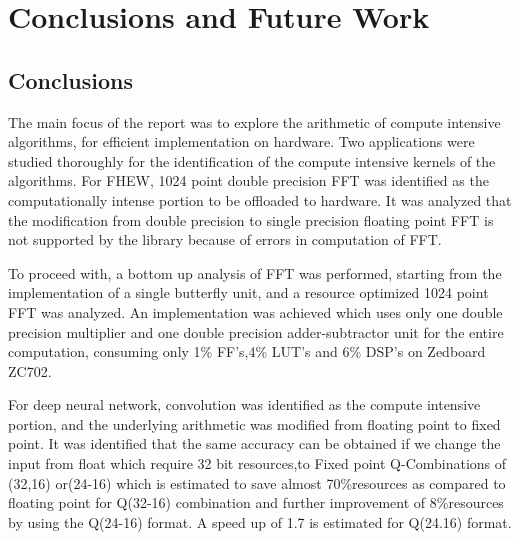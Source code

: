 \chapter{Conclusions and Future Work}\label{Chapter6}
\section{Conclusions}
The main focus of the report was to explore the arithmetic of compute intensive algorithms, for efficient implementation on hardware. Two applications were studied thoroughly for the identification of the compute intensive kernels of the algorithms. For FHEW, 1024 point double precision FFT was identified as the computationally intense portion to be offloaded to hardware. It was analyzed that the modification from double precision to single precision floating point FFT is not supported by the library because of errors in computation of FFT.

To proceed with, a bottom up analysis of FFT was performed, starting from the implementation of a single butterfly unit, and a resource optimized 1024 point FFT was analyzed. An implementation was achieved which uses only one double precision multiplier and one double precision adder-subtractor unit for the entire computation, consuming only 1\% FF's,4\% LUT's and 6\% DSP's on Zedboard ZC702. 

For deep neural network, convolution was identified as the compute intensive portion, and the underlying arithmetic was modified from floating point to fixed point. It was identified that the same accuracy can be obtained if we change the input from float which require 32 bit resources,to Fixed point Q-Combinations of (32,16) or(24-16) which is estimated to save almost 70\%resources as compared to floating point for Q(32-16) combination and further improvement of 8\%resources by using the Q(24-16) format. A speed up of 1.7 is estimated for Q(24.16) format. 

